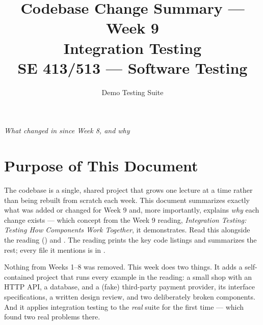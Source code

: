 \documentclass[11pt]{article}
\title{
  \textbf{Codebase Change Summary --- Week 9}\\[4pt]
  \large Integration Testing\\[2pt]
  \normalsize SE 413/513 --- Software Testing
}
\author{Demo Testing Suite}
\date{}
\begin{document}
\maketitle

\begin{center}
\textit{What changed in  since Week 8, and why}
\end{center}

\vspace{0.3cm}

\section{Purpose of This Document}
The  codebase is a single, shared project that
grows one lecture at a time rather than being rebuilt from scratch each
week. This document summarizes exactly what was added or changed for
Week 9 and, more importantly, explains \emph{why} each change exists ---
which concept from the Week 9 reading, \textit{Integration Testing:
Testing How Components Work Together}, it demonstrates. Read this
alongside the reading ()
and . The reading prints the key code
listings and summarizes the rest; every file it mentions is in
.

\begin{keyidea}
Nothing from Weeks 1--8 was removed. This week does two things. It adds
a self-contained project that runs every example in the reading: a
small shop with an HTTP API, a database, and a (fake) third-party
payment provider, its interface specifications, a written design
review, and two deliberately broken components. And it applies
integration testing to the \emph{real} suite for the first time ---
which found two real problems there.
\end{keyidea}

\end{document}

